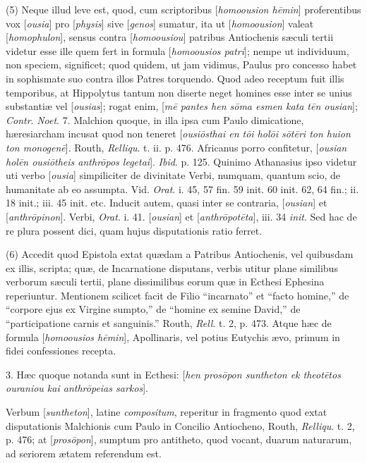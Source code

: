 (5) Neque illud leve est, quod, cum scriptoribus
[\emph{homoousion h\={e}min}] proferentibus vox [\emph{ousia}] pro
[\emph{physis}] sive [\emph{genos}] sumatur, ita ut [\emph{homoousion}]
valeat [\emph{homophulon}], sensus contra [\emph{homoousiou}] patribus
Antiochenis sæculi tertii videtur esse ille quem fert in formula [\emph{homoousios
patri}]; nempe ut individuum, non speciem, significet; quod quidem,
ut jam vidimus, Paulus pro concesso habet in sophismate suo contra
illos Patres torquendo. Quod adeo receptum fuit illis temporibus, at
Hippolytus tantum non diserte neget homines esse inter se unius
substantiæ vel [\emph{ousias}]; rogat enim, [\emph{m\={e} pantes hen
s\={o}ma esmen kata t\={e}n ousian}]; \emph{Contr}. \emph{Noet}.
7. Malchion quoque, in illa ipsa cum Paulo dimicatione, hæresiarcham
incusat quod non teneret [\emph{ousi\={o}sthai en t\={o}i hol\={o}i
s\={o}t\={e}ri ton huion ton monogen\={e}}]. Routh, \emph{Relliqu}.
t. ii. p. 476. Africanus porro confitetur, [\emph{ousian hol\={e}n
ousi\={o}theis anthr\={o}pos legetai}]. \emph{Ibid}. p. 125.
Quinimo Athanasius ipso videtur uti verbo [\emph{ousia}] simpiliciter
de divinitate Verbi, numquam, quantum scio, de humanitate ab eo
assumpta. Vid. \emph{Orat}. i. 45, 57 fin. 59 init. 60 init. 62, 64
fin.; ii. 18 init.; iii. 45 init. etc. Inducit autem, quasi inter se
contraria, [\emph{ousian}] et [\emph{anthr\={o}pinon}]. Verbi, \emph{Orat}.
i. 41. [\emph{ousian}] et [\emph{anthr\={o}pot\={e}ta}], iii. 34
\emph{init}. Sed hac de re plura possent dici, quam hujus
disputationis ratio ferret.

(6) Accedit quod Epistola extat quædam a
Patribus Antiochenis, vel quibusdam ex illis, scripta; quæ, de
Incarnatione disputans, verbis utitur plane similibus verborum sæculi
tertii, plane dissimilibus eorum quæ in Ecthesi Ephesina reperiuntur.
Mentionem scilicet facit de Filio ``incarnato'' et ``facto homine,'' de ``corpore
ejus ex Virgine sumpto,'' de ``homine ex semine David,'' de ``participatione
carnis et sanguinis.'' Routh, \emph{Rell}. t. 2, p. 473. Atque hæc de
formula [\emph{homoousios h\={e}min}], Apollinaris, vel potius
Eutychis ævo, primum in fidei confessiones recepta.

3. Hæc quoque notanda sunt in Ecthesi: [\emph{hen
pros\={o}pon suntheton ek theot\={e}tos ouraniou kai anthr\={o}peias
sarkos}].

Verbum [\emph{suntheton}], latine \emph{compositum},
reperitur in fragmento quod extat disputationis Malchionis cum Paulo
in Concilio Antiocheno, Routh, \emph{Relliqu}. t. 2, p. 476; at [\emph{pros\={o}pon}],
sumptum pro antitheto, quod vocant, duarum naturarum, ad seriorem ætatem
referendum est.


